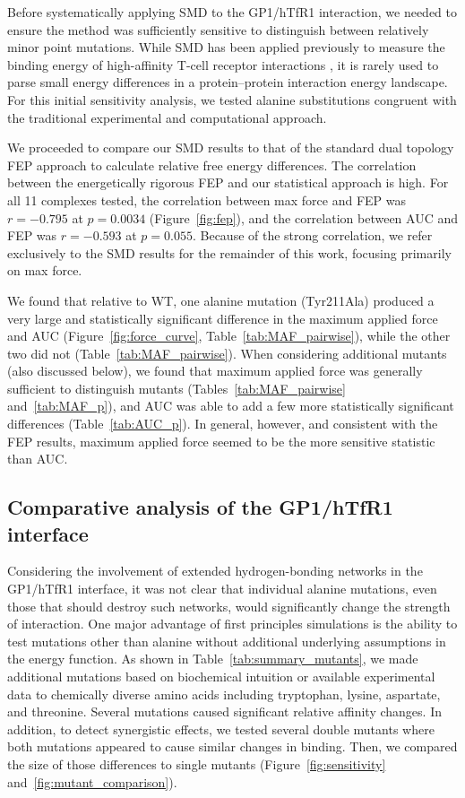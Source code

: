 \documentclass[12pt]{article}
\begin{document}
Before systematically applying SMD to the GP1/hTfR1 interaction, we needed to ensure the method was sufficiently sensitive to distinguish between relatively minor point mutations. While SMD has been applied previously to measure the binding energy of high-affinity T-cell receptor interactions \citep{Cuendet2008,Cuendet2011}, it is rarely used to parse small energy differences in a protein--protein interaction energy landscape. For this initial sensitivity analysis, we tested alanine substitutions congruent with the traditional experimental and computational approach. 

We proceeded to compare our SMD results to that of the standard dual topology FEP approach to calculate relative free energy differences. The correlation between the energetically rigorous FEP and our statistical approach is high. For all 11 complexes tested, the correlation between max force and FEP was $r=-0.795$ at $p=0.0034$ (Figure~\ref{fig:fep}), and the correlation between AUC and FEP was $r=-0.593$ at $p=0.055$. Because of the strong correlation, we refer exclusively to the SMD results for the remainder of this work, focusing primarily on max force.

We found that relative to WT, one alanine mutation (Tyr211Ala) produced a very large and statistically significant difference in the maximum applied force and AUC (Figure~\ref{fig:force_curve}, Table~\ref{tab:MAF_pairwise}), while the other two did not (Table~\ref{tab:MAF_pairwise}). When considering additional mutants (also discussed below), we found that maximum applied force was generally sufficient to distinguish mutants (Tables~\ref{tab:MAF_pairwise} and~\ref{tab:MAF_p}), and AUC was able to add a few more statistically significant differences (Table~\ref{tab:AUC_p}). In general, however, and consistent with the FEP results, maximum applied force seemed to be the more sensitive statistic than AUC.

\subsection{Comparative analysis of the GP1/hTfR1 interface}
Considering the involvement of extended hydrogen-bonding networks in the GP1/hTfR1 interface, it was not clear that individual alanine mutations, even those that should destroy such networks, would significantly change the strength of interaction. One major advantage of first principles simulations is the ability to test mutations other than alanine without additional underlying assumptions in the energy function. As shown in Table~\ref{tab:summary_mutants}, we made additional mutations based on biochemical intuition or available experimental data to chemically diverse amino acids including tryptophan, lysine, aspartate, and threonine. Several mutations caused significant relative affinity changes. In addition, to detect synergistic effects, we tested several double mutants where both mutations appeared to cause similar changes in binding. Then, we compared the size of those differences to single mutants (Figure~\ref{fig:sensitivity} and~\ref{fig:mutant_comparison}).
\end{document}
